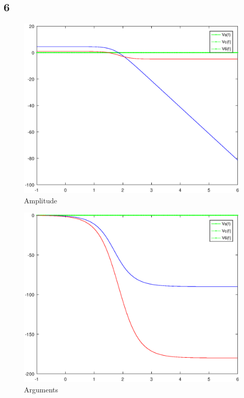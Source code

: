 

\subsection{6}

\begin{figure}[H]
\centering
\includegraphics[width = 15cm]{Amplitude.eps}
\caption {Amplitude}
\end{figure}

\begin{figure}[H]
\centering
\includegraphics[width = 15cm]{Arguments.eps}
\caption {Arguments}
\end{figure}

